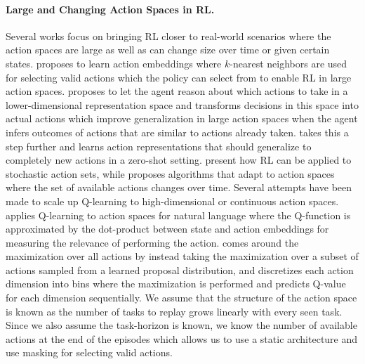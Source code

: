 \paragraph{Large and Changing Action Spaces in RL.} 
Several works focus on bringing RL closer to real-world scenarios where the action spaces are large as well as can change size over time or given certain states.  proposes to learn action embeddings where $k$-nearest neighbors are used for selecting valid actions which the policy can select from to enable RL in large action spaces.  proposes to let the agent reason about which actions to take in a lower-dimensional representation space and transforms decisions in this space into actual actions which improve generalization in large action spaces when the agent infers outcomes of actions that are similar to actions already taken.  takes this a step further and learns action representations that should generalize to completely new actions in a zero-shot setting.  present how RL can be applied to stochastic action sets, while  proposes algorithms that adapt to action spaces where the set of available actions changes over time.  
Several attempts have been made to scale up Q-learning to high-dimensional or continuous action spaces.  applies Q-learning to action spaces for natural language where the Q-function is approximated by the dot-product between state and action embeddings for measuring the relevance of performing the action.  comes around the maximization over all actions by instead taking the maximization over a subset of actions sampled from a learned proposal distribution, and  discretizes each action dimension into bins where the maximization is performed and predicts Q-value for each dimension sequentially. 
We assume that the structure of the action space is known as the number of tasks to replay grows linearly with every seen task. Since we also assume the task-horizon is known, we know the number of available actions at the end of the episodes which allows us to use a static architecture and use masking for selecting valid actions. 

